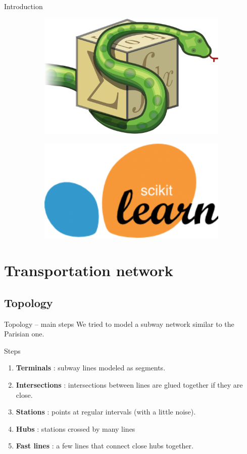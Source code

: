 \begin{frame}[fragile]{Introduction}
\begin{figure}
		\begin{subfigure}{.24\textwidth}
			\centering
			\includegraphics[width=.5\linewidth]{images/sympy.png}
		\end{subfigure}%
		\begin{subfigure}{.24\textwidth}
			\centering
			\includegraphics[width=.5\linewidth]{images/sklearn.png}
		\end{subfigure}
	\end{figure}
\end{frame}

\section{Transportation network}
\subsection{Topology}
\begin{frame}{Topology -- main steps}
	We tried to model a subway network similar to the Parisian one.
	\begin{block}{Steps}
		\begin{enumerate}
			\item \textbf{Terminals} : subway lines modeled as segments.
			\item \textbf{Intersections} : intersections between lines are glued together if they are close.
			\item \textbf{Stations} : points at regular intervals (with a little noise).
			\item \textbf{Hubs} : stations crossed by many lines
			\item \textbf{Fast lines} : a few lines that connect close hubs together.
		\end{enumerate}
	\end{block}
\end{frame}


